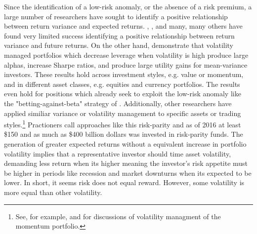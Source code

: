 
Since the identification of a low-risk anomaly, or the absence of a risk premium, a large number of researchers have sought to identify a positive relationship between return variance and expected returns. \citet{CAMPBELL1987373}, \cite{FRENCH19873}, \citet{glosten_1993} and many, many others have found very limited success identifying a positive relationship between return variance and future returns. On the other hand, \citet{moreira_volatility-managed_2017} demonstrate that volatility managed portfolios which decrease leverage when volatility is high produce large alphas, increase Sharpe ratios, and produce large utility gains for mean-variance investors. These results hold across investment styles, e.g. value or momentum, and in different asset classes, e.g. equities and currency portfolios. The results even hold for positions which already seek to exploit the low-risk anomaly like the "betting-against-beta" strategy of \citet{frazzini_betting_2014}. Additionally, other researchers have applied similiar variance or volatility management to specific assets or trading styles.\footnote{See, for example, \citet{barroso_momentum_2015} and \citet{kim_time_2016} for discussions of volatility managment of the momentum portfolio.} Practioners call approaches like this risk-parity and as of 2016 at least \$150 and as much as \$400 billion dollars was invested in risk-parity funds.\citep{steward_truly_2010,cao_risk_2016} The generation of greater expected returns without a equivalent increase in portfolio volatility implies that a representative investor should time asset volatility, demanding less return when its higher meaning the investor's risk appetite must be higher in periods like recession and market downturns when its expected to be lower. In short, it seems risk does not equal reward. However, some volatility is more equal than other volatility.

